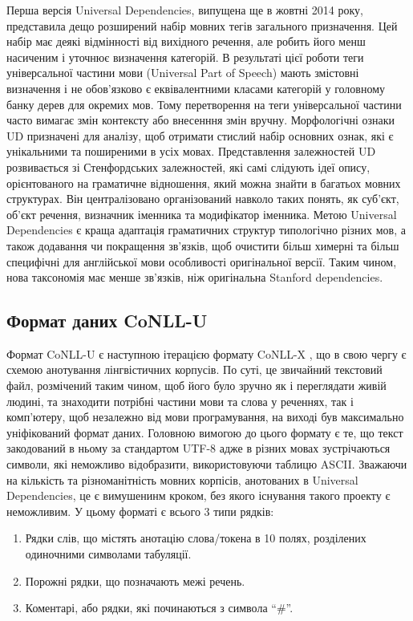 Перша версія Universal Dependencies, випущена ще в жовтні 2014 року, представила дещо розширений набір мовних тегів загального призначення. Цей набір має деякі відмінності від вихідного речення, але робить його менш насиченим і уточнює визначення категорій. В результаті цієї роботи теги універсальної частини мови (Universal Part of Speech) мають змістовні визначення і не обов'язково є еквівалентними класами категорій у головному банку дерев для окремих мов. Тому перетворення на теги універсальної частини часто вимагає змін контексту або внесенння змін вручну. Морфологічні ознаки UD призначені для аналізу, щоб отримати стислий набір основних ознак, які є унікальними та поширеними в усіх мовах. Представлення залежностей UD розвивається зі Стенфордських залежностей, які самі слідують ідеї опису, орієнтованого на граматичне відношення, який можна знайти в багатьох мовних структурах. Він централізовано організований навколо таких понять, як суб’єкт, об’єкт речення, визначник іменника та модифікатор іменника. Метою Universal Dependencies є краща адаптація граматичних структур типологічно різних мов, а також додавання чи покращення зв’язків, щоб очистити більш химерні та більш специфічні для англійської мови особливості оригінальної версії. Таким чином, нова таксономія має менше зв’язків, ніж оригінальна Stanford dependencies.

\subsection{Формат даних CoNLL-U}
Формат CoNLL-U є наступною ітерацією формату CoNLL-X \cite{bib11},
що в свою чергу є схемою анотування лінгвістичних корпусів.
По суті, це звичайний текстовий файл, розмічений таким чином, щоб
його було зручно як і переглядати живій людині, та знаходити потрібні
частини мови та слова у реченнях, так і комп'ютеру, щоб незалежно
від мови програмування, на виході був максимально уніфікований формат даних.
Головною вимогою до цього формату є те, що текст закодований в ньому за
стандартом UTF-8 адже в різних мовах зустрічаються символи, які
неможливо відобразити, використовуючи таблицю ASCII. Зважаючи на
кількість та різноманітність мовних корпісів, анотованих в Universal Dependencies,
це є вимушенинм кроком, без якого існування такого проекту є неможливим.
У цьому форматі є всього 3 типи рядків:

\begin{enumerate}
    \item Рядки слів, що містять анотацію слова/токена в 10 полях, розділених одиночними символами табуляції.
    \item Порожні рядки, що позначають межі речень.
    \item Коментарі, або рядки, які починаються з символа ``\#''.
\end{enumerate}

